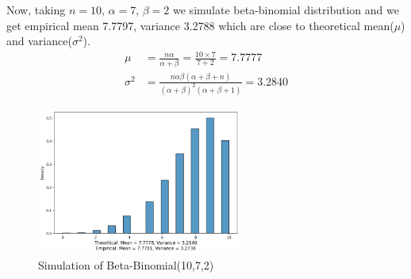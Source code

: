 \begin{example}
    Now, taking $ n=10,\,\alpha=7,\,\beta=2 $ we simulate beta-binomial distribution and we get empirical mean 7.7797, variance 3.2788 which are close to theoretical mean($ \mu $) and variance($ \sigma^2 $).
    \begin{align*}
        \mu &= \frac{n \alpha}{\alpha+\beta} = \frac{10 \times 7 }{ 7 + 2} = 7.7777 \\
        \sigma^2 &= \frac{n \alpha \beta(\alpha+\beta+n)}{(\alpha+\beta)^2(\alpha+\beta+1)} = 3.2840
    \end{align*}
    
    \begin{figure}[H]
        \centering
        \includegraphics[width=0.6\textwidth]{images/gibbs/example2/ex2-beta-binomial.png}
        \caption{Simulation of Beta-Binomial(10,7,2)}
        \label{fig:beta-binomial simulation}
    \end{figure}

\end{example}

